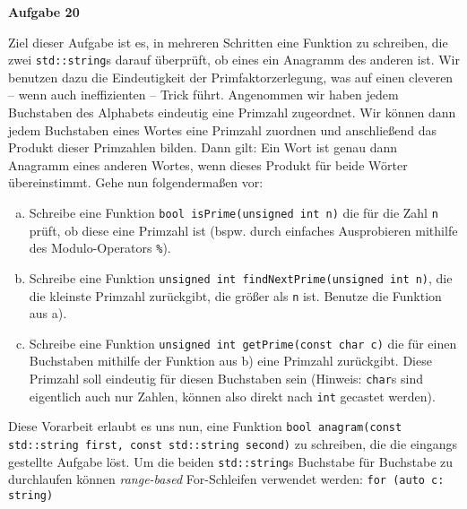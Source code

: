 \documentclass[a4paper,12pt,parskip=full]{scrartcl}
\newcommand{\Aufgabe}[1]{
  {
    \vspace*{0.5cm}
    \textsf{\textbf{Aufgabe #1}}
    \vspace*{0.2cm}
    
  }
}
\begin{document}
\Aufgabe{20}
Ziel dieser Aufgabe ist es, in mehreren Schritten eine Funktion zu schreiben, die zwei
\lstinline{std::string}s darauf überprüft, ob eines ein Anagramm des anderen ist.
Wir benutzen dazu die Eindeutigkeit der Primfaktorzerlegung, was auf einen cleveren
-- wenn auch ineffizienten -- Trick führt.
Angenommen wir haben jedem Buchstaben des Alphabets eindeutig eine Primzahl zugeordnet.
Wir können dann jedem Buchstaben eines Wortes eine Primzahl zuordnen und anschließend
das Produkt dieser Primzahlen bilden. Dann gilt: Ein Wort ist genau dann Anagramm
eines anderen Wortes, wenn dieses Produkt für beide Wörter übereinstimmt. Gehe nun folgendermaßen vor:
\begin{enumerate}[a)]
\item Schreibe eine Funktion \lstinline{bool isPrime(unsigned int n)} die für die Zahl \texttt{n} prüft, ob diese eine Primzahl ist (bspw. durch einfaches Ausprobieren mithilfe des Modulo-Operators \texttt{\%}).
\item Schreibe eine Funktion \lstinline{unsigned int findNextPrime(unsigned int n)}, die die kleinste Primzahl zurückgibt, die größer als \texttt{n} ist. Benutze die Funktion aus a).
\item Schreibe eine Funktion \lstinline{unsigned int getPrime(const char c)} die für einen Buchstaben mithilfe der Funktion aus b) eine Primzahl zurückgibt. Diese Primzahl soll eindeutig für diesen Buchstaben sein (Hinweis: \lstinline{char}s sind eigentlich auch nur Zahlen, können also direkt nach \lstinline{int} gecastet werden).
\end{enumerate}
Diese Vorarbeit erlaubt es uns nun, eine Funktion \lstinline{bool anagram(const std::string first, const std::string second)} zu schreiben, die die eingangs gestellte Aufgabe löst. Um die beiden \lstinline{std::string}s Buchstabe für Buchstabe zu durchlaufen können \emph{range-based} For-Schleifen verwendet werden: \lstinline|for (auto c: string)|
\end{document}
